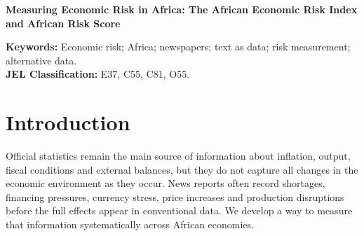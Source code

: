 \documentclass[12pt]{article}
\begin{document}
\begin{titlepage}\thispagestyle{plain}
\begin{center}
{\Large\bfseries Measuring Economic Risk in Africa: The African Economic Risk Index and African Risk Score\par}
\end{center}
\vspace{.35cm}
\begin{abstract}\singlespacing
We develop a multidimensional news-based framework for measuring economic risk across 54 African economies from 2015 to 2025. The African Economic Risk Index (AERI) uses graded article-level scores to capture the prevalence, severity and textual prominence of economic-risk reporting. Eight non-exclusive pillar indices identify where risk is concentrated, while the African Risk Score (ARS) combines bounded measures of intensity, breadth, severity and structural spread on a 0--100 scale. The analysis uses 21.30 million retained article records and 6,488 country-months meeting the principal descriptive coverage threshold. Exact-text deduplication removes 497,091 repeated records (2.33 percent) from the reconstructed frozen vintage; original and duplicate-adjusted AERI remain highly correlated (Pearson 0.9296; rank 0.9883). Aggregate AERI peaks in April 2020, while country histories show substantial heterogeneity in timing, persistence and composition. Alternative ARS weighting produces closely aligned scores. Macroeconomic content is assessed with pooled panel VARs and an external monetary-policy design. Inflation-risk readings precede higher headline inflation, exchange-rate depreciation is followed by higher AERI, and stronger real activity is followed by lower AERI. Externally identified U.S. monetary-policy tightening shocks generate larger subsequent AERI increases among economies with greater predetermined external-debt exposure. Coverage, weighting, exposure and falsification checks support the measurement framework. AERI, the pillars and ARS provide transparent, decomposable measures of reported economic risk for use alongside conventional macroeconomic statistics.
\end{abstract}
\noindent\small\textbf{Keywords:} Economic risk; Africa; newspapers; text as data; risk measurement; alternative data.\\
\textbf{JEL Classification:} E37, C55, C81, O55.
\end{titlepage}

\section{Introduction}\label{sec:introduction}
Official statistics remain the main source of information about inflation, output, fiscal conditions and external balances, but they do not capture all changes in the economic environment as they occur. News reports often record shortages, financing pressures, currency stress, price increases and production disruptions before the full effects appear in conventional data. We develop a way to measure that information systematically across African economies.
\end{document}
